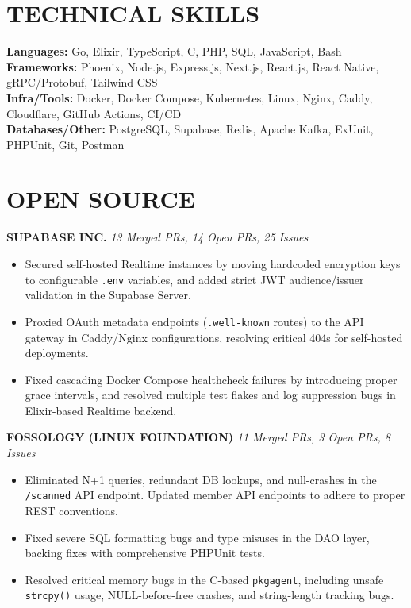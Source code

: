 \documentclass[letterpaper,9.5pt]{article}
\begin{document}
\section{TECHNICAL SKILLS}

\vspace{2pt}
\noindent
\textbf{Languages:} Go, Elixir, TypeScript, C, PHP, SQL, JavaScript, Bash \\
\textbf{Frameworks:} Phoenix, Node.js, Express.js, Next.js, React.js, React Native, gRPC/Protobuf, Tailwind CSS \\
\textbf{Infra/Tools:} Docker, Docker Compose, Kubernetes, Linux, Nginx, Caddy, Cloudflare, GitHub Actions, CI/CD \\
\textbf{Databases/Other:} PostgreSQL, Supabase, Redis, Apache Kafka, ExUnit, PHPUnit, Git, Postman


\section{OPEN SOURCE}

\vspace{1pt}
\noindent\textbf{SUPABASE INC.} \hfill \textit{13 Merged PRs, 14 Open PRs, 25 Issues}
\begin{itemize}
  \item Secured self-hosted Realtime instances by moving hardcoded encryption keys to configurable \texttt{.env} variables, and added strict JWT audience/issuer validation in the Supabase Server.
  \item Proxied OAuth metadata endpoints (\texttt{.well-known} routes) to the API gateway in Caddy/Nginx configurations, resolving critical 404s for self-hosted deployments.
  \item Fixed cascading Docker Compose healthcheck failures by introducing proper grace intervals, and resolved multiple test flakes and log suppression bugs in Elixir-based Realtime backend.
\end{itemize}

\vspace{1pt}
\noindent\textbf{FOSSOLOGY (LINUX FOUNDATION)} \hfill \textit{11 Merged PRs, 3 Open PRs, 8 Issues}
\begin{itemize}
  \item Eliminated N+1 queries, redundant DB lookups, and null-crashes in the \texttt{/scanned} API endpoint. Updated member API endpoints to adhere to proper REST conventions.
  \item Fixed severe SQL formatting bugs and type misuses in the DAO layer, backing fixes with comprehensive PHPUnit tests.
  \item Resolved critical memory bugs in the C-based \texttt{pkgagent}, including unsafe \texttt{strcpy()} usage, NULL-before-free crashes, and string-length tracking bugs.
\end{itemize}
\end{document}
